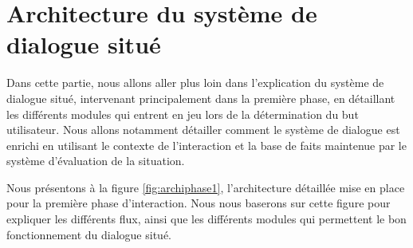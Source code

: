 \documentclass[a4paper,11pt,twoside]{StyleThese}
\begin{document}




\section{Architecture du système de dialogue situé}

Dans cette partie, nous allons aller plus loin dans l'explication du système de dialogue situé, intervenant principalement dans la première phase, en détaillant les différents modules qui entrent en jeu lors de la détermination du but utilisateur. Nous allons notamment détailler comment le système de dialogue est enrichi en utilisant le contexte de l'interaction et la base de faits maintenue par le système d'évaluation de la situation.

Nous présentons à la figure \ref{fig:archiphase1}, l'architecture détaillée mise en place pour la première phase d'interaction. Nous nous baserons sur cette figure pour expliquer les différents flux, ainsi que les différents modules qui permettent le bon fonctionnement du dialogue situé.
\end{document}
